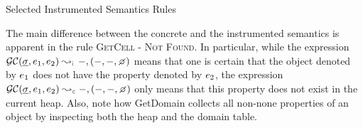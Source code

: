 \begin{display}{Selected Instrumented Semantics Rules}
 \end{display}
 
 The main difference between the concrete and the instrumented semantics is apparent in the rule \textsc{GetCell - Not Found}. 
In particular, while the expression $\absgetcellrule{\instrumented}{\istate, \jsilexpr_1, \jsilexpr_2}{-, (-, -, \none)}$ 
means that one is certain that the object denoted by $e_1$ does not have the property 
denoted by $e_2$, the expression $\absgetcellrule{\concrete}{\istate, \jsilexpr_1, \jsilexpr_2}{-, (-, -, \none)}$ 
only means that this property does not exist in the current heap. Also, note how GetDomain collects all non-none properties of an object by inspecting both the heap and the domain table.

